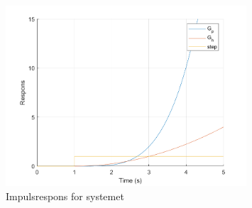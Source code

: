 \documentclass[11pt, a4paper, norsk]{rapport1} %
\begin{document}
\begin{figure}
    \centering
    \includegraphics[width=0.8\textwidth]{figures/oppg1_respons.png}
    \caption{Impulsrespons for systemet}
    \label{fig:1}
\end{figure}
\newpage
\end{document}
